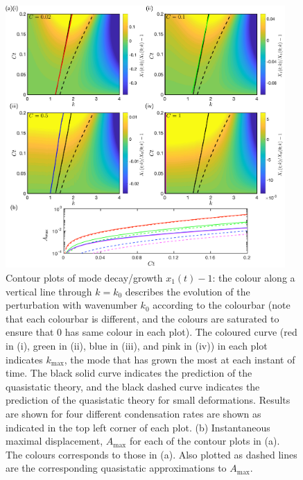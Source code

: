 \begin{figure}[t!]
\includegraphics[width = 0.95\textwidth]{contour_plots_various_C}
\caption{Contour plots of mode decay/growth $x_1(t)- 1$: the colour along a vertical line through $k = k_0$ describes the evolution of the perturbation with wavenumber $k_0$ according to the colourbar (note that each colourbar is different, and the colours are saturated to ensure that $0$ has same colour in each plot). The coloured curve (red in (i), green in (ii), blue in (iii), and pink in (iv)) in each plot indicates $k_{\text{max}}$, the mode that has grown the most at each instant of time. The black solid curve indicates the prediction of the quasistatic theory, and the black dashed curve indicates the prediction of the quasistatic theory for small deformations. Results are shown for four different condensation rates are shown as indicated in the top left corner of each plot. (b) Instantaneous maximal displacement, $A_{\text{max}}$ for each of the contour plots in (a). The colours corresponds to those in (a). Also plotted as dashed lines are the corresponding quasistatic approximations to $A_{\text{max}}$.}\label{fig:InstabilityChapter:TimeDepBaseState:contours_k_t_space}
\end{figure}

